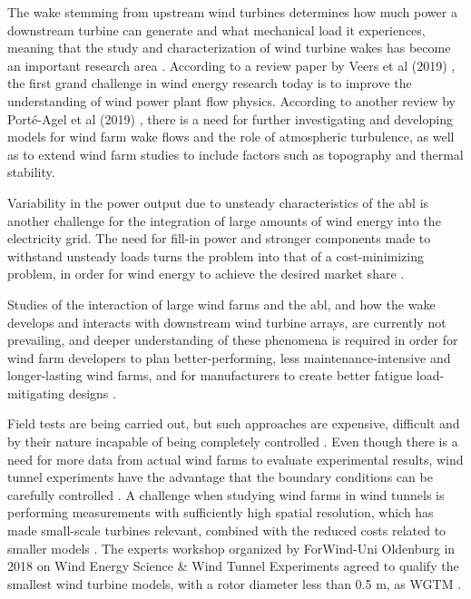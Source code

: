 The wake stemming from upstream wind turbines determines how much power a downstream turbine can generate and what mechanical load it experiences, meaning that the study and characterization of wind turbine wakes has become an important research area \cite{Neunaber} \cite{Tossas2014}. According to a review paper by Veers et al (2019) \cite{Veers2019}, the first grand challenge in wind energy research today is to improve the understanding of wind power plant flow physics. According to another review by Porté-Agel et al (2019) \cite{PorteAgel2019}, there is a need for further investigating and developing models for wind farm wake flows and the role of atmospheric turbulence, as well as to extend wind farm studies to include factors such as topography and thermal stability. 

Variability in the power output due to unsteady characteristics of the \gls{abl} is another challenge for the integration of large amounts of wind energy into the electricity grid. The need for fill-in power and stronger components made to withstand unsteady loads turns the problem into that of a cost-minimizing problem, in order for wind energy to achieve the desired market share \cite{Bossuyt2016}. 

Studies of the interaction of large wind farms and the \gls{abl}, and how the wake develops and interacts with downstream wind turbine arrays, are currently not prevailing, and deeper understanding of these phenomena is required in order for wind farm developers to plan better-performing, less maintenance-intensive and longer-lasting wind farms, and for manufacturers to create better fatigue load-mitigating designs \cite{Tossas2014} \cite{Aubrun2019}. 


Field tests are being carried out, but such approaches are expensive, difficult and by their nature incapable of being completely controlled \cite{Sforza1981}. Even though there is a need for more data from actual wind farms to evaluate experimental results, wind tunnel experiments have the advantage that the boundary conditions can be carefully controlled \cite{Bossuyt2016}. A challenge when  studying wind farms in wind tunnels is performing measurements with sufficiently high spatial resolution, which has made small-scale turbines relevant, combined with the reduced costs related to smaller models \cite{Harrison2010}. The experts workshop organized by ForWind-Uni Oldenburg in 2018 on Wind Energy Science \& Wind Tunnel Experiments  agreed to qualify the smallest wind turbine models, with a rotor diameter less than 0.5 \si{\m}, as \gls{WGTM} \cite{Aubrun2019}.

